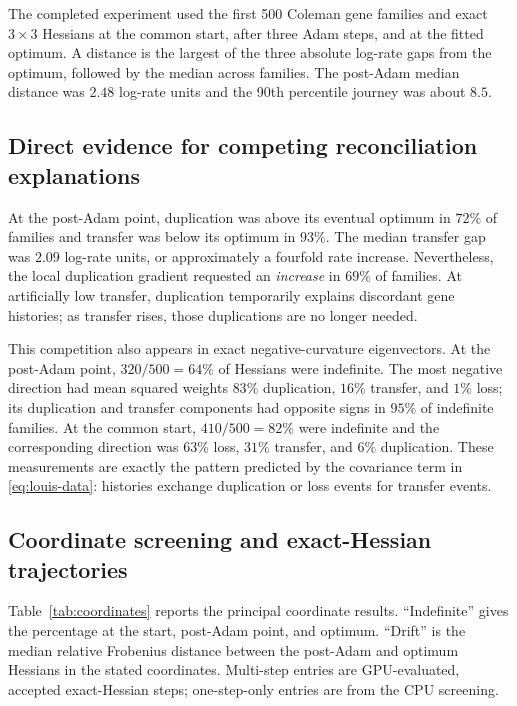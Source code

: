 \documentclass[11pt]{article}
\begin{document}
The completed experiment used the first 500 Coleman gene families and exact $3\times3$ Hessians at
the common start, after three Adam steps, and at the fitted optimum.  A distance is the largest of
the three absolute log-rate gaps from the optimum, followed by the median across families.  The
post-Adam median distance was $2.48$ log-rate units and the 90th percentile journey was about $8.5$.

\subsection{Direct evidence for competing reconciliation explanations}

At the post-Adam point, duplication was above its eventual optimum in $72\%$ of families and
transfer was below its optimum in $93\%$.  The median transfer gap was $2.09$ log-rate units, or
approximately a fourfold rate increase.  Nevertheless, the local duplication gradient requested
an \emph{increase} in $69\%$ of families.  At artificially low transfer, duplication temporarily
explains discordant gene histories; as transfer rises, those duplications are no longer needed.

This competition also appears in exact negative-curvature eigenvectors.  At the post-Adam point,
$320/500=64\%$ of Hessians were indefinite.  The most negative direction had mean squared weights
$83\%$ duplication, $16\%$ transfer, and $1\%$ loss; its duplication and transfer components had
opposite signs in $95\%$ of indefinite families.  At the common start, $410/500=82\%$ were
indefinite and the corresponding direction was $63\%$ loss, $31\%$ transfer, and $6\%$
duplication.  These measurements are exactly the pattern predicted by the covariance term in
\eqref{eq:louis-data}: histories exchange duplication or loss events for transfer events.

\subsection{Coordinate screening and exact-Hessian trajectories}

Table~\ref{tab:coordinates} reports the principal coordinate results.  ``Indefinite'' gives the
percentage at the start, post-Adam point, and optimum.  ``Drift'' is the median relative Frobenius
distance between the post-Adam and optimum Hessians in the stated coordinates.  Multi-step entries
are GPU-evaluated, accepted exact-Hessian steps; one-step-only entries are from the CPU screening.
\end{document}
